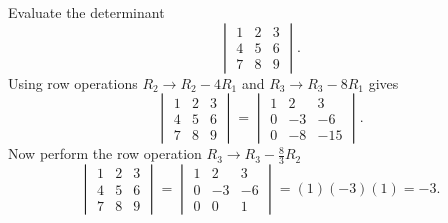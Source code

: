 \documentclass[../main.tex]{subfiles}
\begin{document}
\begin{example} \label{ex:4_11}
  Evaluate the determinant
  \begin{equation*}
    \begin{vmatrix}
      1 & 2 & 3\\
      4 & 5 & 6\\
      7 & 8 & 9
    \end{vmatrix}.
  \end{equation*}
  Using row operations \(R_{2} \rightarrow R_{2} - 4R_{1}\) and \(R_{3} \rightarrow R_{3} - 8R_{1}\) gives
  \begin{equation*}
    \begin{vmatrix}
      1 & 2 & 3\\
      4 & 5 & 6\\
      7 & 8 & 9
    \end{vmatrix}
    =\begin{vmatrix}
      1 & 2 & 3\\
      0 & -3 & -6\\
      0 & -8 & -15
    \end{vmatrix}.
  \end{equation*}
  Now perform the row operation \(R_{3} \rightarrow R_{3} - \frac{8}{3}R_{2}\)
  \begin{equation*}
    \begin{vmatrix}
      1 & 2 & 3\\
      4 & 5 & 6\\
      7 & 8 & 9
    \end{vmatrix}
    =\begin{vmatrix}
      1 & 2 & 3\\
      0 & -3 & -6\\
      0 & 0 & 1
    \end{vmatrix}
    =(1)(-3)(1) = -3.
  \end{equation*}
\end{example}
\end{document}
